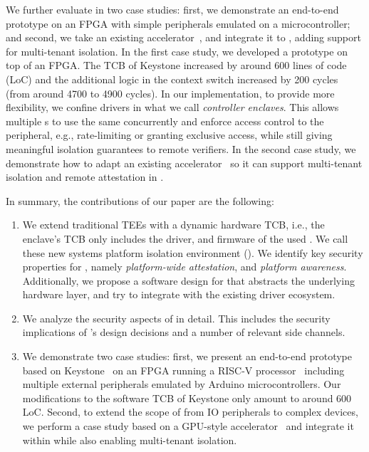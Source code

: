 We further evaluate \name in two case studies: first, we demonstrate an end-to-end prototype on an FPGA with simple peripherals emulated on a microcontroller; and second, we take an existing accelerator~\cite{zaruba2020manticore}, and integrate it to \name{}, adding support for multi-tenant isolation. In the first case study, we developed a prototype on top of an FPGA. The TCB of Keystone increased by around $600$ lines of code (LoC) and the additional logic in the context switch increased by 200 cycles (from around 4700 to 4900 cycles).
In our implementation, to provide more flexibility, we confine drivers in what we call \emph{controller enclaves}. This allows multiple \nameenclave{}s to use the same \sphw concurrently and enforce access control to the peripheral, e.g., rate-limiting or granting exclusive access, while still giving meaningful isolation guarantees to remote verifiers. In the second case study, we demonstrate how to adapt an existing accelerator~\cite{zaruba2020manticore} so it can support multi-tenant isolation and remote attestation in \name{}.



In summary, the contributions of our paper are the following:

\begin{enumerate}
  \item We extend traditional TEEs with a dynamic hardware TCB, i.e., the enclave's TCB only includes the driver, and firmware of the used \sphw. We call these new systems platform isolation environment (\name{}). We identify key security properties for \name{}, namely \emph{platform-wide attestation}, and \emph{platform awareness}. Additionally, we propose a software design for \name that abstracts the underlying hardware layer, and try to integrate with the existing driver ecosystem. 
  
  \item We analyze the security aspects of \name in detail. This includes the security implications of \name{}'s design decisions and a number of relevant side channels.
  
  \item We demonstrate two case studies: first, we present an end-to-end prototype based on Keystone~\cite{keystone} on an FPGA running a RISC-V processor~\cite{ariane} including multiple external peripherals emulated by Arduino microcontrollers. Our modifications to the software TCB of Keystone only amount to around 600 LoC. Second, to extend the scope of \name from IO peripherals to complex devices, we perform a case study based on a GPU-style accelerator~\cite{zaruba2020manticore} and integrate it within \name{} while also enabling multi-tenant isolation.

\end{enumerate}

